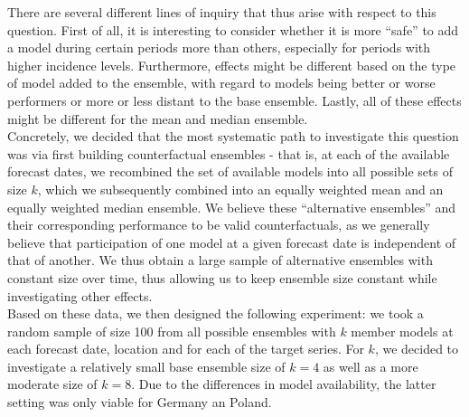 There are several different lines of inquiry that thus arise with respect to this question. First of all, it is interesting to consider whether it is more ``safe'' to add a model during certain periods more than others, especially for periods with higher incidence levels. Furthermore, effects might be different based on the type of model added to the ensemble, with regard to models being better or worse performers or more or less distant to the base ensemble. Lastly, all of these effects might be different for the mean and median ensemble. \\
Concretely, we decided that the most systematic path to investigate this question was via first building counterfactual ensembles - that is, at each of the available forecast dates, we recombined the set of available models into all possible sets of size $k$, which we subsequently combined into an equally weighted mean and an equally weighted median ensemble. We believe these ``alternative ensembles'' and their corresponding performance to be valid counterfactuals, as we generally believe that participation of one model at a given forecast date is independent of that of another. We thus obtain a large sample of alternative ensembles with constant size over time, thus allowing us to keep ensemble size constant while investigating other effects.\\ 
Based on these data, we then designed the following experiment: we took a random sample of size 100 from all possible ensembles with $k$ member models at each forecast date, location and for each of the target series. For $k$, we decided to investigate a relatively small base ensemble size of $k = 4$ as well as a more moderate size of $k = 8$. Due to the differences in model availability, the latter setting was only viable for Germany an Poland.
